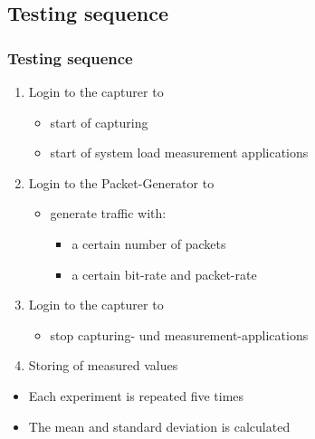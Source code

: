 \documentclass{beamer}
\begin{document}
\subsection*{Testing sequence}
\begin{frame}
\frametitle{Testing sequence}
\begin{enumerate}
	\item Login to the capturer to 
		\begin{itemize}
			\item start of capturing 
			\item start of system load measurement applications 
		\end{itemize}
	\item Login to the Packet-Generator to 

	\begin{itemize}
		\item generate traffic with:
				\begin{itemize}
					\item a certain number of packets
					\item a certain bit-rate and packet-rate
				\end{itemize}
	\end{itemize}

	\item Login to the capturer to 
		\begin{itemize}
			\item stop capturing- und measurement-applications
		\end{itemize}
	\item Storing of measured values
\end{enumerate}
\begin{itemize}
	\item Each experiment is repeated five times
	\item The mean and standard deviation is calculated
\end{itemize}
\end{frame}
\end{document}
